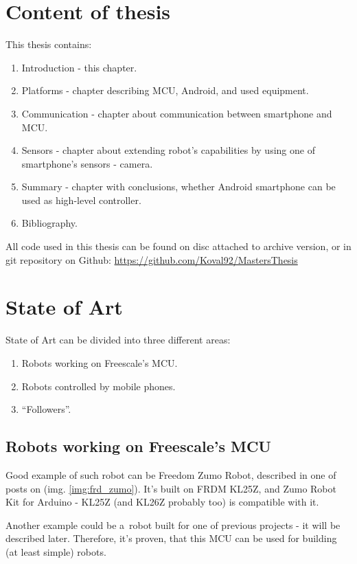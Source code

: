 \section{Content of thesis}
This thesis contains:
\begin{enumerate}
  \item Introduction - this chapter.
  \item Platforms - chapter describing MCU, Android, and used equipment.
  \item Communication - chapter about communication between smartphone and MCU.
  \item Sensors - chapter about extending robot's capabilities by using one of
  smartphone's sensors - camera.
  \item Summary - chapter with conclusions, whether Android smartphone can be
  used as high-level controller.
  \item Bibliography.
\end{enumerate}
All code used in this thesis can be found on disc attached to archive version,
or in git repository on Github: \url{https://github.com/Koval92/MastersThesis}

\section{State of Art}
State of Art can be divided into three different areas:
\begin{enumerate}
  \item Robots working on Freescale's MCU.
  \item Robots controlled by mobile phones.
  \item ``Followers''.
\end{enumerate}

\subsection{Robots working on Freescale's MCU}
Good example of such robot can be Freedom Zumo Robot, described in one of posts
on \cite{mcu_on_eclipse} (img. \ref{img:frd_zumo}).
It's built on FRDM KL25Z, and Zumo Robot Kit for Arduino - KL25Z (and KL26Z
probably too) is compatible with it.

Another example could be a~robot built for one of previous projects - it will be
described later.
Therefore, it's proven, that this MCU can be used for building (at least simple)
robots.

